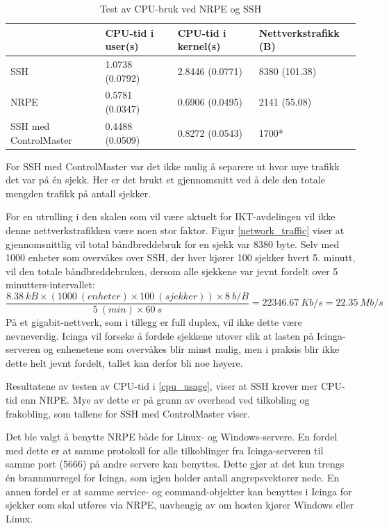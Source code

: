 \begin{table}
    \begin{center}
	\begin{threeparttable}
    \begin{tabular}{| l | l | l | l |} \hline
	\ & \textbf{CPU-tid i user(s)} & \textbf{CPU-tid i kernel(s)} & \textbf{Nettverkstrafikk (B)} \\ \hline
	SSH & 1.0738 (0.0792) & 2.8446 (0.0771) & 8380 (101.38) \\ \hline
	NRPE & 0.5781 (0.0347) & 0.6906 (0.0495) & 2141 (55.08) \\ \hline
	SSH med ControlMaster & 0.4488 (0.0509) & 0.8272 (0.0543) & 1700* \\ \hline
	\end{tabular}
	\begin{tablenotes}
	\small
	\item *For SSH med ControlMaster var det ikke mulig å separere ut hvor mye trafikk det var på én sjekk. Her er det brukt et gjennomsnitt ved å dele den totale mengden trafikk på antall sjekker.
	\end{tablenotes}
	\caption{Test av CPU-bruk ved NRPE og SSH}
	\label{agentcheck}
	\end{threeparttable}
	\end{center}
\end{table}
For en utrulling i den skalen som vil være aktuelt for IKT-avdelingen vil ikke denne nettverkstrafikken være noen stor faktor. Figur \ref{network_traffic} viser at gjennomsnittlig vil total båndbreddebruk for en sjekk var 8380 byte. Selv med 1000 enheter som overvåkes over SSH, der hver kjører 100 sjekker hvert 5. minutt, vil den totale båndbreddebruken, dersom alle sjekkene var jevnt fordelt over 5 minutters-intervallet:
\[\frac{8.38\:kB\times(1000\:(enheter)\times100\:(sjekker))\times8\:b/B}{5\:(min)\times60\:s}=22346.67\:Kb/s = 22.35\:Mb/s \] 
På et gigabit-nettverk, som i tillegg er full duplex, vil ikke dette være nevneverdig. Icinga vil forsøke å fordele sjekkene utover slik at lasten på Icinga-serveren og enhenetene som overvåkes blir minst mulig\cite{icingascheduling}, men i praksis blir ikke dette helt jevnt fordelt, tallet kan derfor bli noe høyere.

Resultatene av testen av CPU-tid i \ref{cpu_usage}, viser at SSH krever mer CPU-tid enn NRPE. Mye av dette er på grunn av overhead ved tilkobling og frakobling, som tallene for SSH med ControlMaster viser. 

Det ble valgt å benytte NRPE både for Linux- og Windows-servere. En fordel med dette er at samme protokoll for alle tilkoblinger fra Icinga-serveren til samme port (5666) på andre servere kan benyttes. Dette gjør at det kun trengs én brannmurregel for Icinga, som igjen holder antall angrepsvektorer nede. En annen fordel er at samme service- og command-objekter kan benyttes i Icinga for sjekker som skal utføres via NRPE, uavhengig av om hosten kjører Windows eller Linux.
